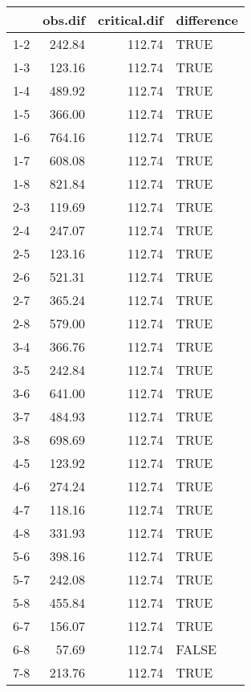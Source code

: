 \begin{table}[ht]
\centering
\begin{tabular}{rrrl}
  \hline
 & obs.dif & critical.dif & difference \\ 
  \hline
1-2 & 242.84 & 112.74 & TRUE \\ 
  1-3 & 123.16 & 112.74 & TRUE \\ 
  1-4 & 489.92 & 112.74 & TRUE \\ 
  1-5 & 366.00 & 112.74 & TRUE \\ 
  1-6 & 764.16 & 112.74 & TRUE \\ 
  1-7 & 608.08 & 112.74 & TRUE \\ 
  1-8 & 821.84 & 112.74 & TRUE \\ 
  2-3 & 119.69 & 112.74 & TRUE \\ 
  2-4 & 247.07 & 112.74 & TRUE \\ 
  2-5 & 123.16 & 112.74 & TRUE \\ 
  2-6 & 521.31 & 112.74 & TRUE \\ 
  2-7 & 365.24 & 112.74 & TRUE \\ 
  2-8 & 579.00 & 112.74 & TRUE \\ 
  3-4 & 366.76 & 112.74 & TRUE \\ 
  3-5 & 242.84 & 112.74 & TRUE \\ 
  3-6 & 641.00 & 112.74 & TRUE \\ 
  3-7 & 484.93 & 112.74 & TRUE \\ 
  3-8 & 698.69 & 112.74 & TRUE \\ 
  4-5 & 123.92 & 112.74 & TRUE \\ 
  4-6 & 274.24 & 112.74 & TRUE \\ 
  4-7 & 118.16 & 112.74 & TRUE \\ 
  4-8 & 331.93 & 112.74 & TRUE \\ 
  5-6 & 398.16 & 112.74 & TRUE \\ 
  5-7 & 242.08 & 112.74 & TRUE \\ 
  5-8 & 455.84 & 112.74 & TRUE \\ 
  6-7 & 156.07 & 112.74 & TRUE \\ 
  6-8 & 57.69 & 112.74 & FALSE \\ 
  7-8 & 213.76 & 112.74 & TRUE \\ 
   \hline
\end{tabular}
\end{table}
